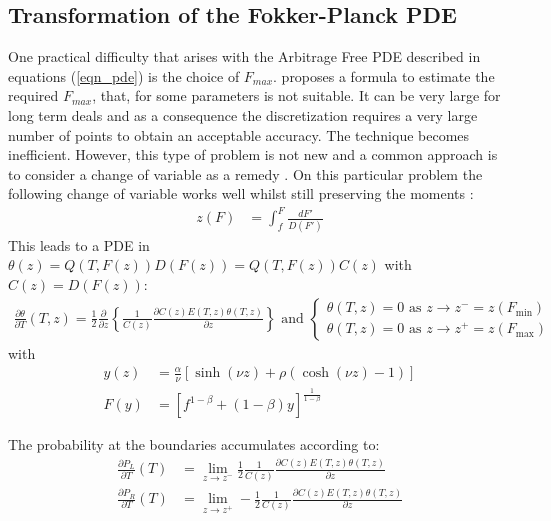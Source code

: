 \documentclass[]{rAMF2e}
\begin{document}
\subsection{Transformation of the Fokker-Planck PDE}
One practical difficulty that arises with the Arbitrage Free PDE described in equations (\ref{eqn_pde}) is the choice of $F_{max}$. \citet{hagan2013arbitrage} proposes a formula to estimate the required $F_{max}$, that, for some parameters is not suitable. It can be very large for long term deals and as a consequence the discretization requires a very large number of points to obtain an acceptable accuracy. The technique becomes inefficient. However, this type of problem is not new and a common approach is to consider a change of variable as a remedy \citep[p. 292 section 7.4]{andersen2010interest}. On this particular problem the following change of variable works well whilst still preserving the moments \citep{hagan2013change}:
\begin{align}\label{eqn-variable-transform}
z(F) &= \int_{f}^F \frac{dF'}{D(F')}
\end{align}
This leads to a PDE in $\theta(z) = Q(T,F(z))D(F(z)) = Q(T,F(z))C(z)$ with $C(z) = D(F(z))$:
\begin{align}\label{eqn-transform-pde}
\frac{\partial \theta}{\partial T}(T,z) = \frac{1}{2} \frac{\partial}{\partial z} \left\lbrace \frac{1}{C(z)} \frac{\partial C(z)E(T,z)\theta(T,z)}{\partial z} \right\rbrace
 \text{ and } \begin{cases}
\theta(T,z) = 0 \text{ as } z \to z^{-}=z(F_{\min})\\
\theta(T,z) = 0 \text{ as } z \to z^{+}=z(F_{\max})
\end{cases}
\end{align}
with \begin{align}
\label{eqn-y(z)}
y(z) &= \frac{\alpha}{\nu}\left[ \sinh(\nu z) + \rho (\cosh(\nu z) - 1) \right]\\ 
\label{eqn-F(z)}
F(y) &= \left[ f^{1-\beta} + (1-\beta)y \right]^{\frac{1}{1-\beta}}
\end{align}

The probability at the boundaries accumulates according to:
\begin{align}\label{eqn-transform-boundary}
\frac{\partial P_L}{\partial T}(T) &= \lim_{z \to z^{-}} \frac{1}{2} \frac{1}{C(z)} \frac{\partial C(z)E(T,z)\theta(T,z)}{\partial z}\\
\frac{\partial P_R}{\partial T}(T) &= \lim_{z \to z^{+}}  -\frac{1}{2} \frac{1}{C(z)} \frac{\partial C(z)E(T,z)\theta(T,z)}{\partial z}
\end{align}
\end{document}
